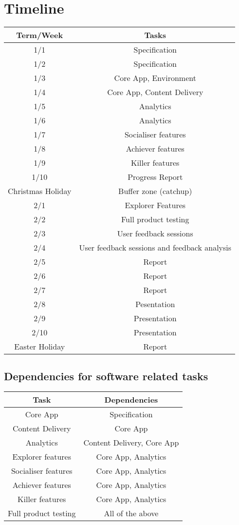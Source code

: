 \documentclass{report}
\begin{document}
\section*{Timeline}
\begin{tabular}{|c|c|}
\hline Term/Week & Tasks \\ 
\hline 1/1 & Specification \\ 
\hline 1/2 & Specification \\ 
\hline 1/3 & Core App, Environment \\ 
\hline 1/4 & Core App, Content Delivery \\ 
\hline 1/5 & Analytics \\ 
\hline 1/6 & Analytics \\ 
\hline 1/7 & Socialiser features \\ 
\hline 1/8 & Achiever features \\ 
\hline 1/9 & Killer features \\ 
\hline 1/10 & Progress Report \\ 
\hline Christmas Holiday & Buffer zone (catchup) \\
\hline 2/1 & Explorer Features \\ 
\hline 2/2 & Full product testing \\ 
\hline 2/3 & User feedback sessions \\ 
\hline 2/4 & User feedback sessions and feedback analysis \\ 
\hline 2/5 & Report \\ 
\hline 2/6 & Report \\ 
\hline 2/7 & Report \\ 
\hline 2/8 & Pesentation \\ 
\hline 2/9 & Presentation \\ 
\hline 2/10 & Presentation \\
\hline Easter Holiday & Report \\
\hline 
\end{tabular}
\subsection*{Dependencies for software related tasks}
\begin{tabular}{|c|c|}
\hline Task & Dependencies \\ 
\hline Core App & Specification \\ 
\hline Content Delivery & Core App \\ 
\hline Analytics & Content Delivery, Core App \\ 
\hline Explorer features & Core App, Analytics \\ 
\hline Socialiser features & Core App, Analytics \\ 
\hline Achiever features & Core App, Analytics \\ 
\hline Killer features & Core App, Analytics \\
\hline Full product testing & All of the above \\
\hline 
\end{tabular} 
\end{document}
